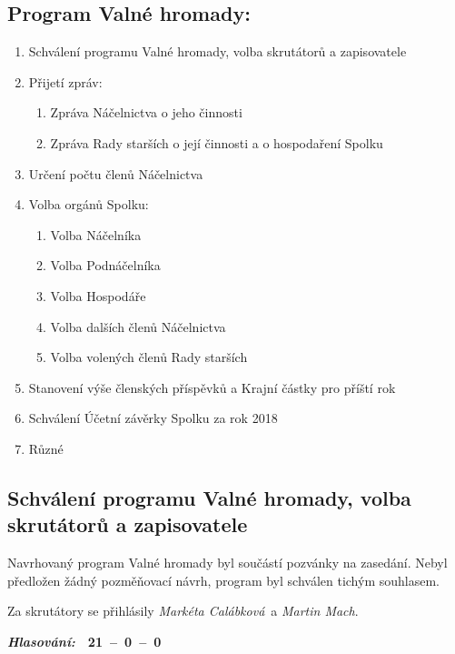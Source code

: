 \documentclass[10pt,a4paper]{report}
\newcommand{\hlas}[3]{
  \begin{flushright}
  {\it\bfseries Hlasování:\/}\ \ {\bfseries #1\ --\ #2\ --\ #3}
  \end{flushright}
}
\newcommand{\pauza}{\vskip 5mm\relax}
\newcommand{\MC}{{\it Markéta Calábková\/}}
\newcommand{\MM}{{\it Martin Mach\/}}
\begin{document}
\subsection*{Program Valné hromady:}
\begin{enumerate}
  \addtocounter{enumi}{-1}
  \item Schválení programu Valné hromady, volba skrutátorů a zapisovatele
  \item Přijetí zpráv:
\begin{enumerate}
  \item Zpráva Náčelnictva o jeho činnosti
  \item Zpráva Rady starších o její činnosti a o hospodaření Spolku
\end{enumerate}
  \item Určení počtu členů Náčelnictva
  \item Volba orgánů Spolku:
\begin{enumerate}
  \item Volba Náčelníka
  \item Volba Podnáčelníka
  \item Volba Hospodáře
  \item Volba dalších členů Náčelnictva
  \item Volba volených členů Rady starších
\end{enumerate}
  \item Stanovení výše členských příspěvků a Krajní částky pro příští rok
  \item Schválení Účetní závěrky Spolku za rok 2018
  \item Různé
\end{enumerate}

\newpage



\addtocounter{subsection}{-1}
\subsection{Schválení programu Valné hromady, volba skrutátorů a zapisovatele}
Navrhovaný program Valné hromady byl součástí pozvánky na zasedání. Nebyl
předložen žádný pozměňovací návrh, program byl schválen tichým souhlasem.
\pauza

Za skrutátory se přihlásily \MC\ a \MM.
\hlas{21}{0}{0}
\end{document}
